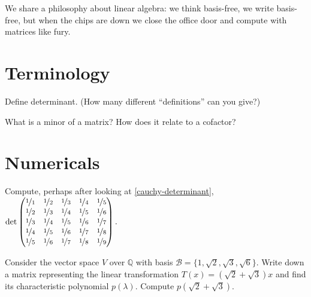\documentclass{homework}
\author{Jim Fowler}
\begin{document}
\maketitle

\begin{inspiration}
  We share a philosophy about linear algebra: we think basis-free, we
  write basis-free, but when the chips are down we close the office
  door and compute with matrices like fury.  
\end{inspiration}

\section{Terminology}

\begin{problem}
  Define determinant.  (How many different ``definitions'' can you give?)
\end{problem}

\begin{problem}
  What is a minor of a matrix?  How does it relate to a cofactor?
\end{problem}

\section{Numericals}

\begin{problem}
  Compute, perhaps after looking at \ref{cauchy-determinant}, \(
    \det \displaystyle\begin{pmatrix}
\nicefrac{1}{1} & \nicefrac{1}{2} & \nicefrac{1}{3} & \nicefrac{1}{4} & \nicefrac{1}{5} \\
\nicefrac{1}{2} & \nicefrac{1}{3} & \nicefrac{1}{4} & \nicefrac{1}{5} & \nicefrac{1}{6} \\
\nicefrac{1}{3} & \nicefrac{1}{4} & \nicefrac{1}{5} & \nicefrac{1}{6} & \nicefrac{1}{7} \\
\nicefrac{1}{4} & \nicefrac{1}{5} & \nicefrac{1}{6} & \nicefrac{1}{7} & \nicefrac{1}{8} \\
\nicefrac{1}{5} & \nicefrac{1}{6} & \nicefrac{1}{7} & \nicefrac{1}{8} & \nicefrac{1}{9}
\end{pmatrix}.\) \\
\end{problem}

\begin{problem}
  Consider the vector space $V$ over $\mathbb{Q}$ with basis
  $ \mathcal{B} = \{1,\sqrt{2},\sqrt{3},\sqrt{6}\}$.  Write down a
  matrix representing the linear transformation
  $T(x) = (\sqrt{2} + \sqrt{3})x$ and find its characteristic
  polynomial $p(\lambda)$.  Compute $p(\sqrt{2} + \sqrt{3})$.
\end{problem}
\end{document}
